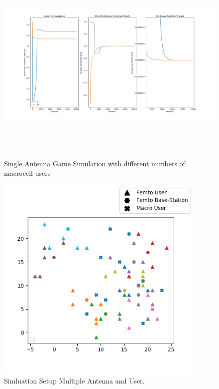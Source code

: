 \documentclass[12pt,a4paper]{report}
\begin{document}
\begin{figure}[H]
	\includegraphics[width= 15cm,height = 10cm]{figures/single_macro}
	  \caption{Single Antenna Game Simulation with different numbers of macrocell users}
\end{figure}

\begin{figure}[H]
	\includegraphics[width=\textwidth,height = 10cm]{figures/system_figure_multiple}
	  \caption{Simluation Setup Multiple Antenna and User.
	  }
\end{figure}
\end{document}
